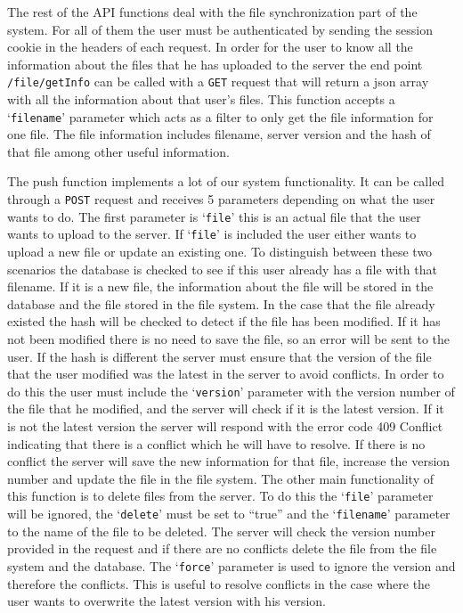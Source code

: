\documentclass[11pt]{article}
\begin{document}
The rest of the API functions deal with the file synchronization part of the system. For all of them the user must be authenticated by sending the session cookie in the headers of each request. In order for the user to know all the information about the files that he has uploaded to the server the end point {\tt /file/getInfo} can be called with a {\tt GET} request that will return a json array with all the information about that user's files. This function accepts a ‘{\tt filename}’ parameter which acts as a filter to only get the file information for one file. The file information includes filename, server version and the hash of that file among other useful information.

The push function implements a lot of our system functionality. It can be called through a {\tt POST} request and receives 5 parameters depending on what the user wants to do. The first parameter is ‘{\tt file}’ this is an actual file that the user wants to upload to the server. If ‘{\tt file}’ is included the user either wants to upload a new file or update an existing one. To distinguish between these two scenarios the database is checked to see if this user already has a file with that filename. If it is a new file, the information about the file will be stored in the database and the file stored in the file system. In the case that the file already existed the hash will be checked to detect if the file has been modified. If it has not been modified there is no need to save the file, so an error will be sent to the user. If the hash is different the server must ensure that the version of the file that the user modified was the latest in the server to avoid conflicts. In order to do this the user must include the ‘{\tt version}’ parameter with the version number of the file that he modified, and the server will check if it is the latest version. If it is not the latest version the server will respond with the error code 409 Conflict indicating that there is a conflict which he will have to resolve. If there is no conflict the server will save the new information for that file, increase the version number and update the file in the file system. The other main functionality of this function is to delete files from the server. To do this the ‘{\tt file}’ parameter will be ignored, the ‘{\tt delete}’ must be set to “true” and the ‘{\tt filename}’ parameter to the name of the file to be deleted. The server will check the version number provided in the request and if there are no conflicts delete the file from the file system and the database. The ‘{\tt force}’ parameter is used to ignore the version and therefore the conflicts. This is useful to resolve conflicts in the case where the user wants to overwrite the latest version with his version.
\end{document}
